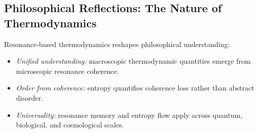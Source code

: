 \subsection{Philosophical Reflections: The Nature of Thermodynamics}

Resonance‐based thermodynamics reshapes philosophical understanding:
\begin{itemize}
  \item \emph{Unified understanding:} macroscopic thermodynamic quantities emerge from microscopic resonance coherence.
  \item \emph{Order from coherence:} entropy quantifies coherence loss rather than abstract disorder.
  \item \emph{Universality:} resonance memory and entropy flow apply across quantum, biological, and cosmological scales.
\end{itemize}


